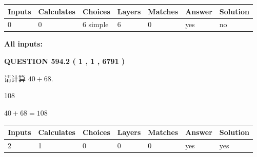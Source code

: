 \documentclass{ctexart}
\begin{document}
   
\noindent\begin{tabular}{|l|l|l|l|l|l|l|}
 \hline
Inputs & Calculates & Choices & Layers & Matches & Answer & Solution \\ \hline
 0  & 
 0  & 
 6
  simple  
  & 
 6  & 
 0  & 
  yes & 
  no 
  \\ \hline
 \end{tabular}
   
   
   
   
\noindent{}
   
   
   
   
\noindent\vspace{0.1in}\hspace{-0.08in} {\textbf{\Large{All inputs: }}}
   
   
  
\vspace{0.2in}
  
{\textbf{\Large{QUESTION
594.2 
 ( 1 , 1 , 6791 )
}}}
  
  
 
请计算 $ %
40 +  %
68 $.
 
 
 
\noindent{}
 
 

108
 
 
\noindent{}
 
 

 
 
 
\noindent{}
 
 

$ %
40 +  %
68=   %
108$
 
 
\noindent{}
 
 

 
   
   
   
   
\noindent\begin{tabular}{|l|l|l|l|l|l|l|}
 \hline
Inputs & Calculates & Choices & Layers & Matches & Answer & Solution \\ \hline
 2  & 
 1  & 
 0
  & 
 0  & 
 0  & 
  yes & 
  yes 
  \\ \hline
 \end{tabular}
   
\end{document}
